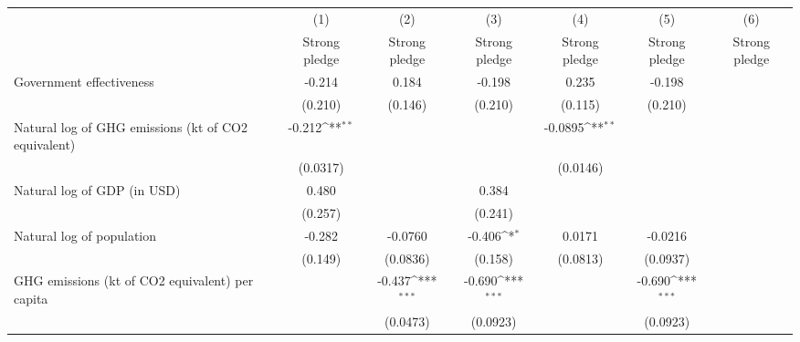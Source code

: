 {
\def\sym#1{\ifmmode^{#1}\else\(^{#1}\)\fi}
\begin{tabular}{l*{6}{c}}
\hline\hline
                    &\multicolumn{1}{c}{(1)}&\multicolumn{1}{c}{(2)}&\multicolumn{1}{c}{(3)}&\multicolumn{1}{c}{(4)}&\multicolumn{1}{c}{(5)}&\multicolumn{1}{c}{(6)}\\
                    &\multicolumn{1}{c}{Strong pledge}&\multicolumn{1}{c}{Strong pledge}&\multicolumn{1}{c}{Strong pledge}&\multicolumn{1}{c}{Strong pledge}&\multicolumn{1}{c}{Strong pledge}&\multicolumn{1}{c}{Strong pledge}\\
\hline
Government effectiveness&      -0.214         &       0.184         &      -0.198         &       0.235         &      -0.198         &                     \\
                    &     (0.210)         &     (0.146)         &     (0.210)         &     (0.115)         &     (0.210)         &                     \\
[1em]
Natural log of GHG emissions (kt of CO2 equivalent)&      -0.212\sym{**} &                     &                     &     -0.0895\sym{**} &                     &                     \\
                    &    (0.0317)         &                     &                     &    (0.0146)         &                     &                     \\
[1em]
Natural log of GDP (in USD)&       0.480         &                     &       0.384         &                     &                     &                     \\
                    &     (0.257)         &                     &     (0.241)         &                     &                     &                     \\
[1em]
Natural log of population&      -0.282         &     -0.0760         &      -0.406\sym{*}  &      0.0171         &     -0.0216         &                     \\
                    &     (0.149)         &    (0.0836)         &     (0.158)         &    (0.0813)         &    (0.0937)         &                     \\
[1em]
GHG emissions (kt of CO2 equivalent) per capita&                     &      -0.437\sym{***}&      -0.690\sym{***}&                     &      -0.690\sym{***}&                     \\
                    &                     &    (0.0473)         &    (0.0923)         &                     &    (0.0923)         &                     \\

\end{tabular}}
